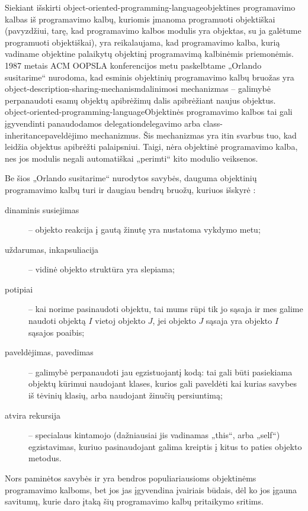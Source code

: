 Siekiant išskirti
\gls{object-oriented-programming-language}{objektines programavimo
kalbas} iš programavimo kalbų, kuriomis įmanoma programuoti
objektiškai (pavyzdžiui, tarę, kad programavimo kalbos 
modulis yra objektas, su ja galėtume programuoti objektiškai), yra
reikalaujama, kad programavimo kalba, kurią vadiname objektine
palaikytų objektinį programavimą kalbinėmis priemonėmis. 1987
metais ACM OOPSLA konferencijos metu paskelbtame „Orlando
susitarime“ 
\cite{Lieberman:1987:TO:62139.62144} nurodoma, kad esminis
objektinių programavimo kalbų bruožas yra 
\gls{object-description-sharing-mechanism}{dalinimosi 
mechanizmas} – galimybė perpanaudoti esamų objektų apibrėžimų dalis
apibrėžiant naujus objektus.
\gls{object-oriented-programming-language}{Objektinės programavimo kalbos}
tai gali įgyvendinti panaudodamos \gls{delegation}{delegavimo} arba
\gls{class-inheritance}{paveldėjimo}
mechanizmus.
Šis mechanizmas yra itin svarbus tuo, kad leidžia objektus apibrėžti
palaipsniui. Taigi,  nėra objektinė programavimo
kalba, nes jos modulis negali automatiškai „perimti“ kito modulio
veiksenos.

Be šios „Orlando susitarime“ nurodytos savybės, dauguma
objektinių programavimo kalbų turi ir daugiau bendrų bruožų,
kuriuos išskyrė \cite[225-227]{types-and-programming-languages}:
\begin{description}
  \item[dinaminis susiejimas]  –
    objekto reakcija į gautą žinutę yra nustatoma vykdymo metu;
  \item[uždarumas, inkapsuliacija]  – vidinė objekto
    struktūra yra slepiama;
  \item[potipiai]  – kai norime pasinaudoti objektu, 
    tai mums rūpi tik jo sąsaja ir mes galime naudoti objektą $I$ vietoj
    objekto $J$, jei objekto $J$ sąsaja yra objekto $I$ sąsajos poaibis;
  \item[paveldėjimas, pavedimas]  – galimybė
    perpanaudoti jau egzistuojantį kodą: tai gali būti pasiekiama
    objektų kūrimui naudojant klases, kurios gali paveldėti kai kurias
    savybes iš tėvinių klasių, arba naudojant žinučių persiuntimą;
  \item[atvira rekursija]  – specialaus kintamojo
    (dažniausiai jis vadinamas „this“, arba „self“)
    egzistavimas, kuriuo pasinaudojant galima kreiptis į kitus to
    paties objekto metodus.
\end{description}
Nors paminėtos savybės ir yra bendros populiariausioms objektinėms
programavimo kalboms, bet jos jas įgyvendina įvairiais būdais,
dėl ko jos įgauna savitumų, kurie daro įtaką šių programavimo
kalbų pritaikymo sritims.

